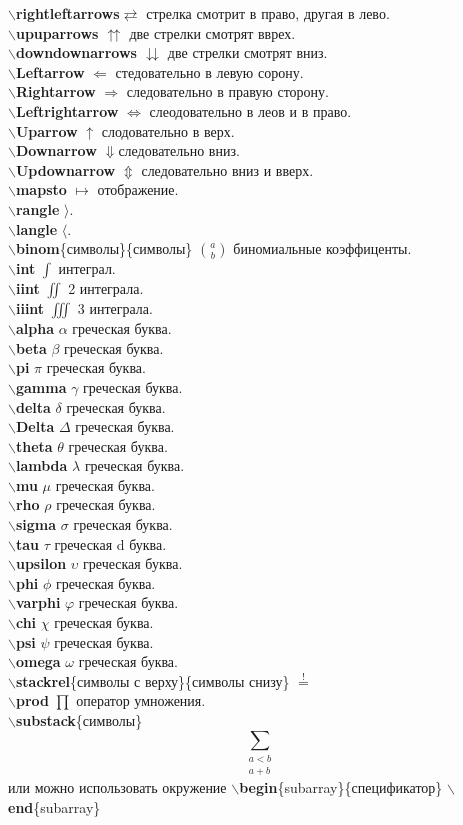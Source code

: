 \documentclass{article}
\newcommand{\bs}{$\backslash$}
\newcommand{\bd}[1]{{\bfseries #1}} %
\newcommand{\bb}[1]{\bd{\bs #1}} %
\begin{document}
\bb{rightleftarrows}$\rightleftarrows$ стрелка смотрит в право, другая в лево.\\
\bb{upuparrows} $\upuparrows$ две стрелки смотрят вврех.\\
\bb{downdownarrows} $\downdownarrows$ две стрелки смотрят вниз.\\
\bb{Leftarrow} $\Leftarrow$ стедовательно в левую сорону.\\
\bb{Rightarrow} $\Rightarrow$ следовательно в правую сторону.\\
\bb{Leftrightarrow} $\Leftrightarrow$ слеодовательно в леов и в право.\\
\bb{Uparrow} $\uparrow$ слодовательно в верх.\\
\bb{Downarrow} $\Downarrow$следовательно вниз.\\
\bb{Updownarrow} $\Updownarrow$ следовательно вниз и вверх.\\
\bb{mapsto} $\mapsto$ отображение.\\
\bb{rangle} $\rangle$.\\
\bb{langle} $\langle$.\\
\bb{binom}\{символы\}\{символы\} $\binom{a}{b}$ биномиальные коэффиценты.\\
\bb{int} $\int$ интеграл.\\
\bb{iint} $\iint$ 2 интеграла.\\
\bb{iiint} $\iiint$ 3 интеграла.\\
\bb{alpha} $\alpha$ греческая буква.\\
\bb{beta} $\beta$ греческая буква.\\
\bb{pi} $\pi$ греческая буква.\\
\bb{gamma} $\gamma$ греческая буква.\\
\bb{delta} $\delta$ греческая буква.\\
\bb{Delta} $\Delta$ греческая буква.\\
\bb{theta} $\theta$ греческая буква.\\
\bb{lambda} $\lambda$ греческая буква.\\
\bb{mu} $\mu$ греческая буква.\\
\bb{rho} $\rho$ греческая буква.\\
\bb{sigma} $\sigma$ греческая буква.\\
\bb{tau} $\tau$ греческая d
буква.\\
\bb{upsilon} $\upsilon$ греческая буква.\\
\bb{phi} $\phi$ греческая буква.\\
\bb{varphi} $\varphi$ греческая буква.\\
\bb{chi} $\chi$ греческая буква.\\
\bb{psi} $\psi$ греческая буква.\\
\bb{omega} $\omega$ греческая буква.\\
\bb{stackrel}\{символы с верху\}\{символы снизу\} $\stackrel{!}{=}$\\
\bb{prod} $\prod$ оператор умножения.\\
\bb{substack}\{символы\} \[\sum_{\substack{a<b \\ a+b}}\] или можно использовать
окружение \bb{begin}\{subarray\}\{спецификатор\} \bb{end}\{subarray\}\\ \\
\end{document}
